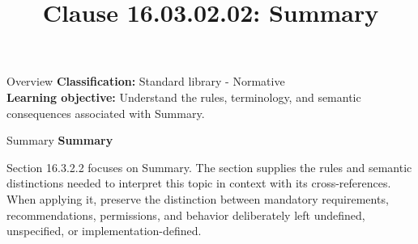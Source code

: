 \documentclass[10pt,letterpaper]{article}
\title{Clause 16.03.02.02: Summary}
\author{}
\date{}
\begin{document}
\maketitle
\begin{CornellOverviewBox}{Overview}
\textbf{Classification:} Standard library - Normative\\[2pt]
\textbf{Learning objective:} Understand the rules, terminology, and semantic consequences associated with Summary.
\end{CornellOverviewBox}\begin{CornellSummaryBox}{Summary}
{\sffamily\bfseries\color{Accent} Summary}\par\vspace{3pt}Section 16.3.2.2 focuses on Summary. The section supplies the rules and semantic distinctions needed to interpret this topic in context with its cross-references. When applying it, preserve the distinction between mandatory requirements, recommendations, permissions, and behavior deliberately left undefined, unspecified, or implementation-defined.
\end{CornellSummaryBox}
\end{document}
